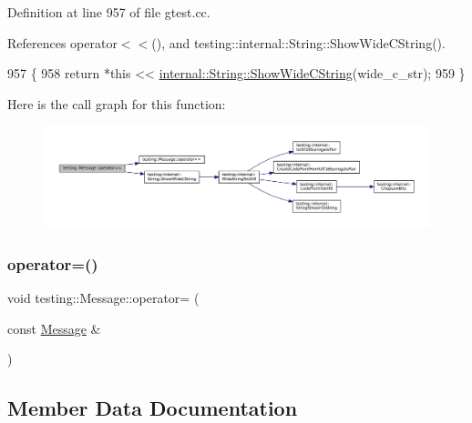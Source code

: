 Definition at line 957 of file gtest.\+cc.



References operator$<$$<$(), and testing\+::internal\+::\+String\+::\+Show\+Wide\+C\+String().


\begin{DoxyCode}
957                                                  \{
958   \textcolor{keywordflow}{return} *\textcolor{keyword}{this} << \hyperlink{classtesting_1_1internal_1_1String_aaf7e376ff580677ea4954d5913d5b917}{internal::String::ShowWideCString}(wide\_c\_str);
959 \}
\end{DoxyCode}
Here is the call graph for this function\+:
\nopagebreak
\begin{figure}[H]
\begin{center}
\leavevmode
\includegraphics[width=350pt]{classtesting_1_1Message_ac1d3a041ac4bb9c929ee746b31a13d6a_cgraph}
\end{center}
\end{figure}
\mbox{\label{classtesting_1_1Message_a5a0462b539ffb88f15ea0c67977774af}} 
\subsubsection{\texorpdfstring{operator=()}{operator=()}}
{\footnotesize\ttfamily void testing\+::\+Message\+::operator= (\begin{DoxyParamCaption}\item[{const \hyperlink{classtesting_1_1Message}{Message} \&}]{ }\end{DoxyParamCaption})\hspace{0.3cm}{\ttfamily [private]}}



\subsection{Member Data Documentation}
\mbox{\label{classtesting_1_1Message_ad46fbddd62cde8526744ae32e3322b76}} 

